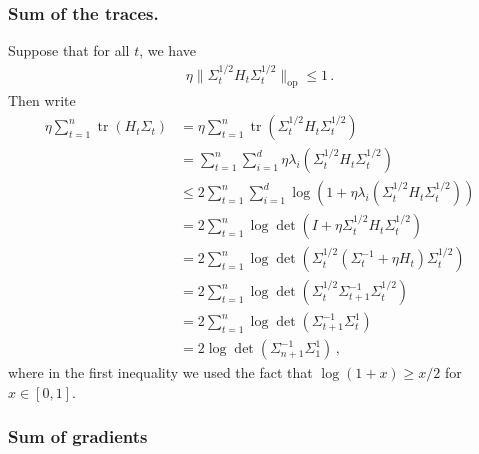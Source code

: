 \documentclass{article}
\theoremstyle{plain}
\theoremstyle{definition}
\theoremstyle{plain}
\newcommand{\tr}{\operatorname{tr}}
\begin{document}
\subsubsection{Sum of the traces.}
Suppose that for all $t$, we have
\begin{align}
    \eta \| \Sigma_t^{1/2} H_t \Sigma_t^{1/2} \|_{\mathrm{op}} \leq 1\,.
\end{align}
Then write
\begin{align}
    \eta  \sum_{t=1}^n \tr(H_t\Sigma_t)
     & =
    \eta  \sum_{t=1}^n \tr(\Sigma_t^{1/2} H_t \Sigma_t^{1/2})
    \\
     & =
    \sum_{t=1}^n \sum_{i=1}^d \eta  \lambda_i(\Sigma_t^{1/2} H_t \Sigma_t^{1/2})
    \\
     & \leq
    2 \sum_{t=1}^n \sum_{i=1}^d \log\left(1 + \eta \lambda_i(\Sigma_t^{1/2} H_t \Sigma_t^{1/2})\right)
    \\
     & =
    2 \sum_{t=1}^n \log \det\left(I + \eta \Sigma_t^{1/2} H_t \Sigma_t^{1/2}\right)
    \\
     & =
    2 \sum_{t=1}^n \log \det\left(\Sigma_t^{1/2} \left( \Sigma_t^{-1} + \eta H_t\right) \Sigma_t^{1/2}\right)
    \\
     & =
    2 \sum_{t=1}^n \log \det\left(\Sigma_t^{1/2} \Sigma_{t+1}^{-1} \Sigma_t^{1/2}\right)
    \\
     & =
    2 \sum_{t=1}^n \log \det\left(\Sigma_{t+1}^{-1} \Sigma_t^{1}\right)
    \\
     & =
    2 \log \det\left(\Sigma_{n+1}^{-1} \Sigma_1^{1}\right)\,,
\end{align}
where in the first inequality we used the fact that $\log(1+x)\geq x/2$ for $x\in[0,1]$.

\subsubsection{Sum of gradients}
\end{document}
